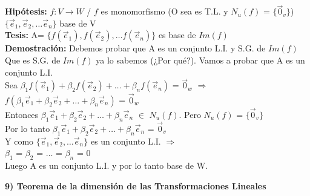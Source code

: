\documentclass[11pt]{article}
\begin{document}
\vspace{2mm} \noindent
{\bfseries Hipótesis:} $f: V \rightarrow W$ / $f$ es monomorfismo (O sea es T.L. y $N_u(f)$ = $\{\vec{0}_v\}$) \\
$\{\vec{e}_1, \vec{e}_2, \hdots  \vec{e}_n\}$ base de V \\
{\bfseries Tesis:} A= $\{f(\vec{e}_1), f(\vec{e}_2), \hdots  f(\vec{e}_n)\}$ es base de $Im(f)$ \\
{\bfseries Demostración:} Debemos probar que A es un conjunto L.I. y S.G. de $Im(f)$ \\
Que es S.G. de $Im(f)$ ya lo sabemos (¿Por qué?). Vamos a probar que A es un conjunto L.I. \\
Sea $\beta_1 f(\vec{e}_1) + \beta_2 f(\vec{e}_2) + \hdots + \beta_n f(\vec{e}_n)$ = $\vec{0}_w$ $\Rightarrow$ \\
$f(\beta_1 \vec{e}_1 + \beta_2 \vec{e}_2 + \hdots + \beta_n \vec{e}_n)$ = $\vec{0}_w$ \\
Entonces $\beta_1 \vec{e}_1 + \beta_2 \vec{e}_2 + \hdots + \beta_n \vec{e}_n$ $\in$ $N_u(f)$. Pero $N_u(f)$ = $\{\vec{0}_v\}$ \\
Por lo tanto $\beta_1 \vec{e}_1 + \beta_2 \vec{e}_2 + \hdots + \beta_n \vec{e}_n$ = $\vec{0}_v$ \\
Y como $\{\vec{e}_1, \vec{e}_2, \hdots  \vec{e}_n\}$ es un conjunto L.I. $\Rightarrow$\\
$\beta_1$ = $\beta_2$ = $\hdots$ = $\beta_n$ = 0\\
Luego A es un conjunto L.I. y por lo tanto base de W.

\vspace{2mm} \noindent
{\Large \bfseries{9) Teorema de la dimensión de las Transformaciones Lineales}}
\end{document}
